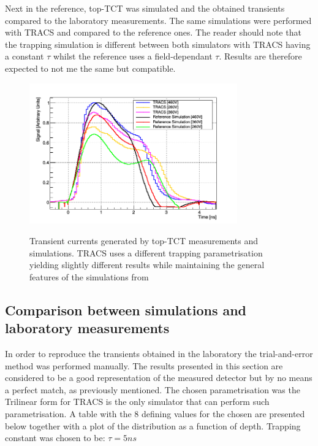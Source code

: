 Next in the reference, top-TCT was simulated and the obtained transients compared to the laboratory measurements. The same simulations were performed with TRACS and compared to the reference ones. The reader should note that the trapping simulation is different between both simulators with TRACS having a constant $\tau$ whilst the reference uses a field-dependant $\tau$. Results are therefore expected to not me the same but compatible.

\begin{figure}[H]
	\centering
	\includegraphics[width=0.8\textwidth]{Pohlsen_scr.png}
	\label{fig:mues2}
	\caption{Transient currents generated by top-TCT measurements and simulations. TRACS uses a different trapping parametrisation yielding slightly different results while maintaining the general features of the simulations from \cite{Reference1}}
\end{figure}


\subsection{Comparison between simulations and laboratory measurements}


In order to reproduce the transients obtained in the laboratory the trial-and-error method was performed manually. The results presented in this section are considered to be a good representation of the measured detector but by no means a perfect match, as previously mentioned. The chosen \neff parametrisation was the Trilinear form for TRACS is the only simulator that can perform such parametrisation. A table with the 8 defining values for the chosen \neff are presented below together with a plot of the \neff distribution as a function of depth. Trapping constant was chosen to be: $\tau = 5 ns$

